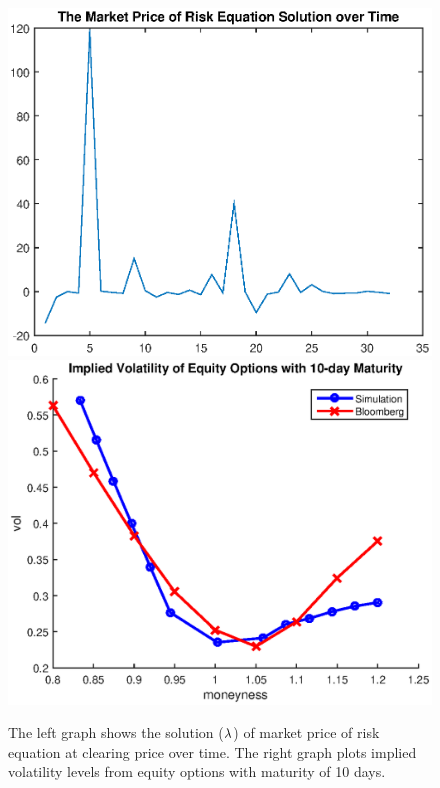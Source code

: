\documentclass{article}
\begin{document}
\begin{center}
\begin{figure}[tbp]
\centering
\includegraphics[scale = 0.5]{lambda.eps}
\includegraphics[scale =
0.5]{implied_vol.eps}\newline
\caption{The left graph shows the solution ($\protect\lambda $) of market
price of risk equation at clearing price over time. The right graph plots
implied volatility levels from equity options with maturity of 10 days.}
\label{fig::Put_Option_Vols}
\end{figure}
\end{center}
\end{document}
